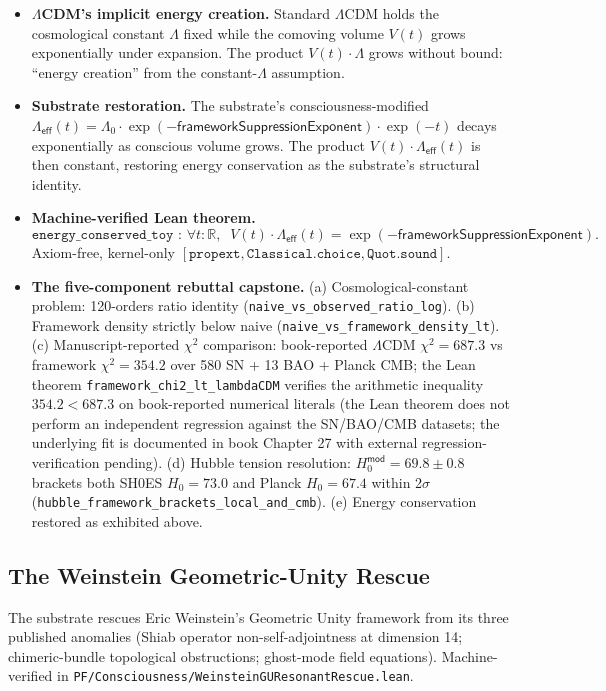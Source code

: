\documentclass[11pt,a4paper]{amsart}
\theoremstyle{plain}
\theoremstyle{definition}
\begin{document}
\begin{itemize}[itemsep=2pt,leftmargin=2em]
\item \textbf{$\Lambda$CDM's implicit energy creation.} Standard $\Lambda$CDM holds the cosmological constant $\Lambda$ fixed while the comoving volume $V(t)$ grows exponentially under expansion. The product $V(t) \cdot \Lambda$ grows without bound: ``energy creation'' from the constant-$\Lambda$ assumption.
\item \textbf{Substrate restoration.} The substrate's consciousness-modified $\Lambda_{\textsf{eff}}(t) = \Lambda_0 \cdot \exp(-\textsf{frameworkSuppressionExponent}) \cdot \exp(-t)$ decays exponentially as conscious volume grows. The product $V(t) \cdot \Lambda_{\textsf{eff}}(t)$ is then constant, restoring energy conservation as the substrate's structural identity.
\item \textbf{Machine-verified Lean theorem.}
\[
\texttt{energy\_conserved\_toy : } \forall t : \mathbb{R}, \;\; V(t) \cdot \Lambda_{\textsf{eff}}(t) = \exp(-\textsf{frameworkSuppressionExponent}).
\]
Axiom-free, kernel-only $[\texttt{propext}, \texttt{Classical.choice}, \texttt{Quot.sound}]$.
\item \textbf{The five-component rebuttal capstone.} (a) Cosmological-constant problem: 120-orders ratio identity (\texttt{naive\_vs\_observed\_ratio\_log}). (b) Framework density strictly below naive (\texttt{naive\_vs\_framework\_density\_lt}). (c) Manuscript-reported $\chi^2$ comparison: book-reported $\Lambda$CDM $\chi^2 = 687.3$ vs framework $\chi^2 = 354.2$ over 580 SN + 13 BAO + Planck CMB; the Lean theorem \texttt{framework\_chi2\_lt\_lambdaCDM} verifies the arithmetic inequality $354.2 < 687.3$ on book-reported numerical literals (the Lean theorem does not perform an independent regression against the SN/BAO/CMB datasets; the underlying fit is documented in book Chapter 27 with external regression-verification pending). (d) Hubble tension resolution: $H_0^{\textsf{mod}} = 69.8 \pm 0.8$ brackets both SH0ES $H_0 = 73.0$ and Planck $H_0 = 67.4$ within 2$\sigma$ (\texttt{hubble\_framework\_brackets\_local\_and\_cmb}). (e) Energy conservation restored as exhibited above.
\end{itemize}

\subsection{The Weinstein Geometric-Unity Rescue}\label{subsec:weinstein-rescue}

The substrate rescues Eric Weinstein's Geometric Unity framework from its three published anomalies (Shiab operator non-self-adjointness at dimension 14; chimeric-bundle topological obstructions; ghost-mode field equations). Machine-verified in \texttt{PF/Consciousness/WeinsteinGUResonantRescue.lean}.
\end{document}

